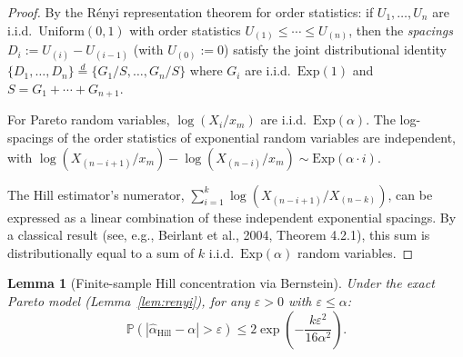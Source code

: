 \documentclass[11pt]{article}
\newtheorem{lemma}[theorem]{Lemma}
\theoremstyle{definition}
\newcommand{\Prob}{\mathbb{P}}
\newcommand{\abs}[1]{\left| #1 \right|}
\newcommand{\ahat}{\hat{\alpha}}
\begin{document}
\begin{proof}
By the R\'enyi representation theorem for order statistics: if $U_1, \ldots, U_n$
are i.i.d.\ $\mathrm{Uniform}(0,1)$ with order statistics $U_{(1)} \leq \cdots \leq U_{(n)}$,
then the \emph{spacings} $D_i := U_{(i)} - U_{(i-1)}$ (with $U_{(0)} := 0$)
satisfy the joint distributional identity
$\{D_1, \ldots, D_n\} \stackrel{d}{=} \{G_1/S, \ldots, G_n/S\}$
where $G_i$ are i.i.d.\ $\mathrm{Exp}(1)$ and $S = G_1 + \cdots + G_{n+1}$.

For Pareto random variables, $\log(X_i/x_m)$ are i.i.d.\ $\mathrm{Exp}(\alpha)$.
The log-spacings of the order statistics of exponential random variables are
independent, with $\log(X_{(n-i+1)}/x_m) - \log(X_{(n-i)}/x_m) \sim \mathrm{Exp}(\alpha \cdot i)$.

The Hill estimator's numerator, $\sum_{i=1}^k \log(X_{(n-i+1)}/X_{(n-k)})$,
can be expressed as a linear combination of these independent exponential spacings.
By a classical result (see, e.g., Beirlant et al., 2004, Theorem 4.2.1),
this sum is distributionally equal to a sum of $k$ i.i.d.\ $\mathrm{Exp}(\alpha)$
random variables.
\end{proof}

\begin{lemma}[Finite-sample Hill concentration via Bernstein]\label{lem:hill_conc}
Under the exact Pareto model (Lemma~\ref{lem:renyi}), for any $\varepsilon > 0$
with $\varepsilon \leq \alpha$:
\begin{equation}\label{eq:hill_bound}
  \Prob\!\left(\abs{\ahat_{\mathrm{Hill}} - \alpha} > \varepsilon\right)
  \leq 2\exp\!\left(-\frac{k\varepsilon^2}{16\alpha^2}\right).
\end{equation}
\end{lemma}
\end{document}

